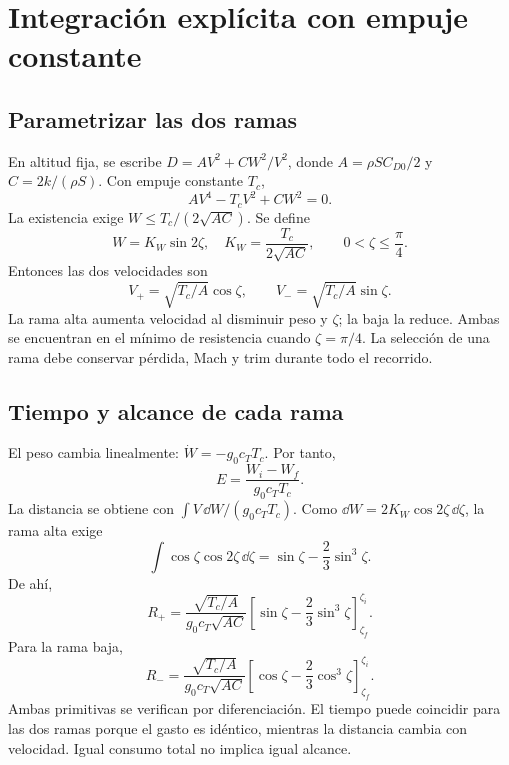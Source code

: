 \section{Integración explícita con empuje constante}
\subsection{Parametrizar las dos ramas}
En altitud fija, se escribe $D=AV^2+CW^2/V^2$, donde $A=\rho SC_{D0}/2$ y $C=2k/(\rho S)$. Con empuje constante $T_c$,
\begin{equation}
AV^4-T_cV^2+CW^2=0.
\end{equation}
La existencia exige $W\leq T_c/(2\sqrt{AC})$. Se define
\begin{equation}
W=K_W\sin2\zeta,\quad K_W=\frac{T_c}{2\sqrt{AC}},\qquad 0<\zeta\leq\frac\pi4.
\end{equation}
Entonces las dos velocidades son
\begin{equation}
V_+=\sqrt{T_c/A}\cos\zeta,\qquad
V_-=\sqrt{T_c/A}\sin\zeta.
\end{equation}
La rama alta aumenta velocidad al disminuir peso y $\zeta$; la baja la reduce. Ambas se encuentran en el mínimo de resistencia cuando $\zeta=\pi/4$. La selección de una rama debe conservar pérdida, Mach y trim durante todo el recorrido.

\subsection{Tiempo y alcance de cada rama}
El peso cambia linealmente: $\dot W=-g_0c_TT_c$. Por tanto,
\begin{equation}
E=\frac{W_i-W_f}{g_0c_TT_c}.
\end{equation}
La distancia se obtiene con $\int V\,\dd W/(g_0c_TT_c)$. Como $\dd W=2K_W\cos2\zeta\,\dd\zeta$, la rama alta exige
\begin{equation}
\int\cos\zeta\cos2\zeta\,\dd\zeta
=\sin\zeta-\frac23\sin^3\zeta.
\end{equation}
De ahí,
\begin{equation}
R_+=\frac{\sqrt{T_c/A}}{g_0c_T\sqrt{AC}}
\left[\sin\zeta-\frac23\sin^3\zeta\right]_{\zeta_f}^{\zeta_i}.
\end{equation}
Para la rama baja,
\begin{equation}
R_-=\frac{\sqrt{T_c/A}}{g_0c_T\sqrt{AC}}
\left[\cos\zeta-\frac23\cos^3\zeta\right]_{\zeta_f}^{\zeta_i}.
\end{equation}
Ambas primitivas se verifican por diferenciación. El tiempo puede coincidir para las dos ramas porque el gasto es idéntico, mientras la distancia cambia con velocidad. Igual consumo total no implica igual alcance.

